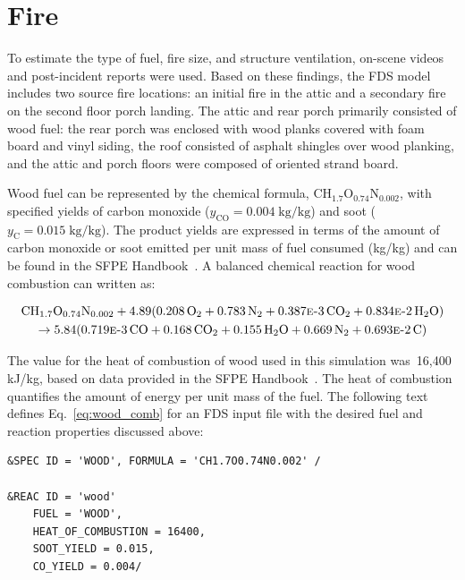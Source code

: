 \documentclass[12pt,oneside]{book}
\renewcommand{\C}{\mbox{C}}
\renewcommand{\H}{\mbox{H}}
\renewcommand{\O}{\mbox{O}}
\newcommand{\N}{\mbox{N}}
\begin{document}
\section{Fire}
\label{fire}

To estimate the type of fuel, fire size, and structure ventilation, on-scene videos and post-incident reports were used. Based on these findings, the FDS model includes two source fire locations: an initial fire in the attic and a secondary fire on the second floor porch landing. The attic and rear porch primarily consisted of wood fuel: the rear porch was enclosed with wood planks covered with foam board and vinyl siding, the roof consisted of asphalt shingles over wood planking, and the attic and porch floors were composed of oriented strand board.

Wood fuel can be represented by the chemical formula, $\C\H_{1.7}\O_{0.74}\N_{0.002}$, with specified yields of carbon monoxide ($y_{\mathrm{CO}}=0.004 \; \mathrm{kg}/\mathrm{kg}$) and soot ($y_{\mathrm{C}}=0.015 \; \mathrm{kg}/\mathrm{kg}$). The product yields are expressed in terms of the amount of carbon monoxide or soot emitted per unit mass of fuel consumed (kg/kg) and can be found in the SFPE Handbook~\cite{SFPE:Tewarson}. A balanced chemical reaction for wood combustion can written as:

\begin{multline}
\C\H_{1.7}\O_{0.74}\N_{0.002} + 4.89(0.208\,\O_{2} + 0.783\,\N_{2} + 0.387\text{\sc{e}-}3\,\C\O_{2} + 0.834\text{\sc{e}-}2\,\H_{2}\O) \\ 
\rightarrow 5.84(0.719\text{\sc{e}-}3\,\C\O + 0.168\,\C\O_{2} + 0.155\,\H_{2}\O + 0.669\,\N_{2} + 0.693\text{\sc{e}-}2\,\C)
\label{eq:wood_comb}
\end{multline}

The value for the heat of combustion of wood used in this simulation was~16,400 kJ/kg, based on data provided in the SFPE Handbook~\cite{SFPE:Tewarson}. The heat of combustion quantifies the amount of energy per unit mass of the fuel. The following text defines Eq.~\ref{eq:wood_comb} for an FDS input file with the desired fuel and reaction properties discussed above:

\begin{lstlisting}
&SPEC ID = 'WOOD', FORMULA = 'CH1.7O0.74N0.002' /

&REAC ID = 'wood' 
    FUEL = 'WOOD', 
    HEAT_OF_COMBUSTION = 16400,
    SOOT_YIELD = 0.015,
    CO_YIELD = 0.004/
\end{lstlisting}
\end{document}
